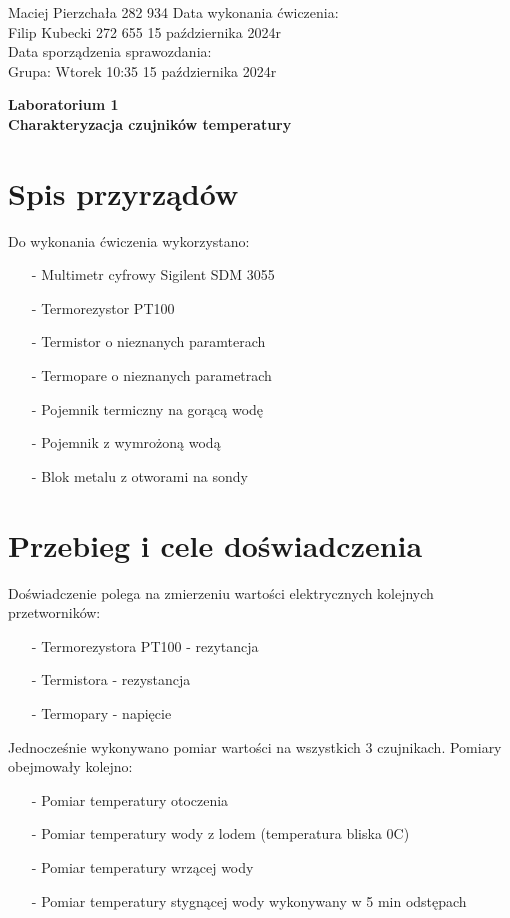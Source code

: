 \documentclass[11pt]{article}
\begin{document}
    \begin{flushleft}
        Maciej Pierzchała 282 934 \hfill Data wykonania ćwiczenia:\\
        Filip Kubecki 272 655 \hfill 15 października 2024r\\
        \hfill Data sporządzenia sprawozdania:\\
        Grupa: Wtorek 10:35 \hfill 15 października 2024r\\
    \end{flushleft}
    \begin{center}
        \Large\textbf{Laboratorium 1}\\
        \textbf{Charakteryzacja czujników temperatury}
    \end{center}
    \hfill
    \section{Spis przyrządów}
    \par{
        Do wykonania ćwiczenia wykorzystano:
        \begin{itemize}
            \setlength\itemsep{0em}
            \item[-] Multimetr cyfrowy Sigilent SDM 3055
            \item[-] Termorezystor PT100
            \item[-] Termistor o nieznanych paramterach
            \item[-] Termopare o nieznanych parametrach
            \item[-] Pojemnik termiczny na gorącą wodę
            \item[-] Pojemnik z wymrożoną wodą
            \item[-] Blok metalu z otworami na sondy
        \end{itemize}
    }
    \section{Przebieg i cele doświadczenia}
    \noindent Doświadczenie polega na zmierzeniu wartości elektrycznych kolejnych przetworników:
    \begin{itemize}
        \setlength\itemsep{0em}
        \item[-] Termorezystora PT100 - rezytancja
        \item[-] Termistora - rezystancja
        \item[-] Termopary - napięcie
    \end{itemize}
    \par Jednocześnie wykonywano pomiar wartości na wszystkich 3 czujnikach. Pomiary obejmowały kolejno:
    \begin{itemize}
        \setlength\itemsep{0em}
        \item[-] Pomiar temperatury otoczenia
        \item[-] Pomiar temperatury wody z lodem (temperatura bliska 0\textdegree C)
        \item[-] Pomiar temperatury wrzącej wody
        \item[-] Pomiar temperatury stygnącej wody wykonywany w 5 min odstępach
    \end{itemize}
    
\end{document}
